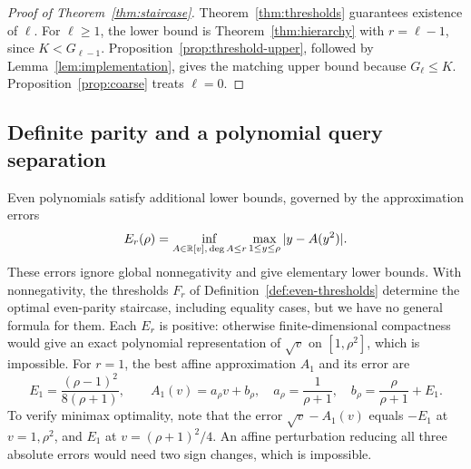 \begin{proof}[Proof of Theorem~\ref{thm:staircase}]
Theorem~\ref{thm:thresholds} guarantees existence of $\ell$. For $\ell\geq1$, the lower bound is Theorem~\ref{thm:hierarchy} with $r=\ell-1$, since $K<G_{\ell-1}$. Proposition~\ref{prop:threshold-upper}, followed by Lemma~\ref{lem:implementation}, gives the matching upper bound because $G_\ell\leq K$. Proposition~\ref{prop:coarse} treats $\ell=0$.
\end{proof}

\subsection{Definite parity and a polynomial query separation}
Even polynomials satisfy additional lower bounds, governed by the approximation errors
\[
 E_r(\rho)=\inf_{A\in\mathbb R[v],\,\deg A\leq r}
 \max_{1\leq y\leq\rho}|y-A(y^2)|.
\]
These errors ignore global nonnegativity and give elementary lower bounds. With nonnegativity, the thresholds $F_r$ of Definition~\ref{def:even-thresholds} determine the optimal even-parity staircase, including equality cases, but we have no general formula for them. Each $E_r$ is positive: otherwise finite-dimensional compactness would give an exact polynomial representation of $\sqrt v$ on $[1,\rho^2]$, which is impossible. For $r=1$, the best affine approximation $A_1$ and its error are
\begin{equation}\label{eq:E1}
 E_1=\frac{(\rho-1)^2}{8(\rho+1)},\qquad
 A_1(v)=a_\rho v+b_\rho,\quad
 a_\rho=\frac1{\rho+1},\quad
 b_\rho=\frac\rho{\rho+1}+E_1.
\end{equation}
To verify minimax optimality, note that the error $\sqrt v-A_1(v)$ equals $-E_1$ at $v=1,\rho^2$, and $E_1$ at $v=(\rho+1)^2/4$. An affine perturbation reducing all three absolute errors would need two sign changes, which is impossible.

